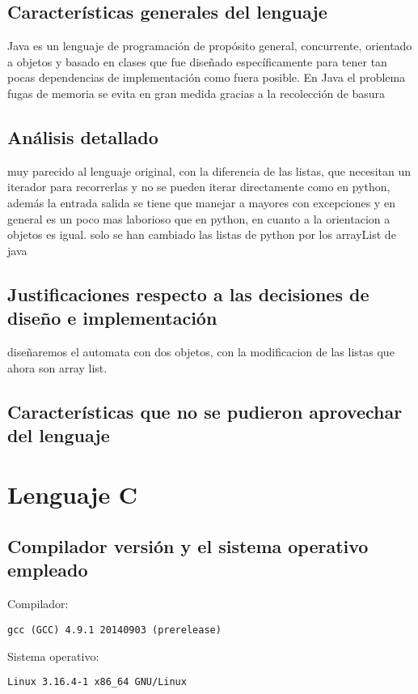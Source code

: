 \documentclass[12pt,a4paper]{article}
\begin{document}
\subsection{Características generales del lenguaje}
    Java es un lenguaje de programación de propósito general, concurrente, orientado a objetos y basado en clases que fue diseñado específicamente para tener tan pocas dependencias de implementación como fuera posible.
    En Java el problema fugas de memoria se evita en gran medida gracias a la recolección de basura

\subsection{Análisis detallado}
    muy parecido al lenguaje original, con la diferencia de las listas, que necesitan un iterador para recorrerlas y no se pueden iterar
    directamente como en python, además la entrada salida se tiene que manejar a mayores con excepciones y en general es un poco mas laborioso que
    en python, en cuanto a la orientacion a objetos es igual. solo se han cambiado las listas de python por los arrayList de java
\subsection{Justificaciones respecto a las decisiones de diseño e implementación}
    diseñaremos el automata con dos objetos, con la modificacion de las listas que ahora son array list.
\subsection{Características que no se pudieron aprovechar del lenguaje}


\section{Lenguaje C}
\subsection{Compilador versión y el sistema operativo empleado}
Compilador:
\begin{lstlisting}
gcc (GCC) 4.9.1 20140903 (prerelease)
\end{lstlisting}
Sistema operativo:
\begin{lstlisting}
Linux 3.16.4-1 x86_64 GNU/Linux
\end{lstlisting}
\end{document}
